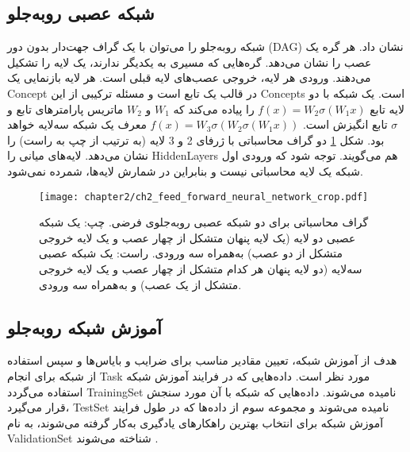  \subsection{شبکه عصبی روبه‌جلو}
 شبکه روبه‌جلو را می‌توان با یک گراف جهت‌دار بدون دور (\gls{DAG}) نشان‌ داد. هر گره یک عصب را نشان می‌دهد. گره‌هایی که مسیری به یکدیگر ندارند، یک لایه را تشکیل می‌دهند. ورودی هر لایه، خروجی عصب‌های لایه قبلی است. هر لایه بازنمایی یک \gls{Concept} در قالب یک تابع است و مسئله ترکیبی از این \glspl{Concept} است. یک شبکه با دو لایه تابع 
 $ f(x)=W_2\sigma(W_1 x) $
 را پیاده می‌کند که $ W_1 $ و $ W_2 $  ماتریس پارامترهای تابع و $ \sigma $ تابع انگیزش است.
 $ f(x)=W_3\sigma(W_2\sigma(W_1 x)) $
 معرف یک شبکه سه‌لایه خواهد بود. شکل \ref{ch2_feed_forward_neural_network_crop.pdf} دو گراف محاسباتی با ژرفای 2 و 3 لایه (به ترتیب از چپ به راست) را نشان می‌دهد. لایه‌های میانی را \glspl{HiddenLayer} هم می‌گویند. توجه شود که ورودی اول شبکه یک لایه محاسباتی نیست و بنابراین در شمارش لایه‌ها، شمرده نمی‌شود.
 
 
     
 \begin{figure}[ht!]%
 	\centering
 	\texttt{[image: chapter2/ch2\_feed\_forward\_neural\_network\_crop.pdf]}
 	\caption[گراف محاسباتی شبکه عصبی روبه‌جلو]
 	{
 		گراف محاسباتی برای دو شبکه عصبی روبه‌جلوی فرضی. چپ: یک شبکه عصبی دو لایه (یک لایه پنهان متشکل از چهار عصب و یک لایه خروجی متشکل از دو عصب) به‌همراه سه ورودی. راست: یک شبکه عصبی سه‌لایه (دو لایه پنهان هر کدام متشکل از چهار عصب و یک لایه خروجی متشکل از یک عصب) و به‌همراه سه ورودی. 
 	}
 	\label{ch2_feed_forward_neural_network_crop.pdf}
 \end{figure}
 
 
 \subsection{آموزش شبکه روبه‌جلو}\label{feedforwardtraining}
 هدف از آموزش شبکه، تعیین مقادیر مناسب برای ضرایب و بایاس‌ها و سپس استفاده از شبکه برای انجام \gls{Task} مورد نظر است. داده‌هایی که در فرایند آموزش شبکه استفاده می‌گردد \gls{TrainingSet} نامیده می‌شوند. داده‌هایی که شبکه با آن مورد سنجش قرار می‌گیرد، \gls{TestSet} نامیده می‌شوند و مجموعه سوم از داده‌ها که در طول فرایند آموزش شبکه برای انتخاب بهترین راهکارهای یادگیری به‌کار گرفته می‌شوند، به نام \gls{ValidationSet} شناخته می‌شوند \cite{Goodfellow-et-al-2016}. 
 

